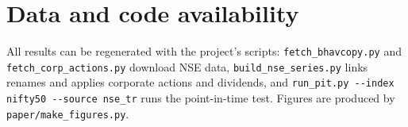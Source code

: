 \documentclass[11pt]{article}
\begin{document}
\section*{Data and code availability}
All results can be regenerated with the project's scripts: \texttt{fetch\_bhavcopy.py} and
\texttt{fetch\_corp\_actions.py} download NSE data, \texttt{build\_nse\_series.py} links renames and applies
corporate actions and dividends, and \texttt{run\_pit.py -{}-index nifty50 -{}-source nse\_tr} runs the point-in-time
test. Figures are produced by \texttt{paper/make\_figures.py}.



\end{document}
